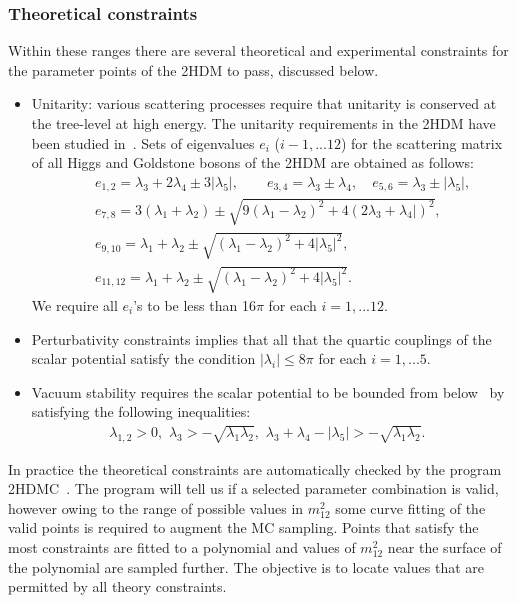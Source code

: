 \subsubsection{Theoretical constraints}
Within these ranges there are several theoretical and experimental constraints for the parameter points of the 2HDM to pass, discussed below.	
\begin{itemize}
	\item Unitarity: various scattering processes  require that unitarity is conserved at the tree-level at high energy.
    The unitarity requirements in the 2HDM have been studied in~\cite{Kanemura1993LeeQuiggThacker, Akeroyd2000TreeLevel, arhrib2000unitarity}.
	Sets of eigenvalues $e_i$ ($i-1, ... 12$) for the scattering  matrix of all Higgs and Goldstone bosons of the 2HDM are obtained as follows:
	\begin{eqnarray}
	&& e_{1,2} =  \lambda_3+2\lambda_4\pm 3 | \lambda_5| , \quad  \quad  e_{3,4} = \lambda_3\pm\lambda_4 , \quad e_{5,6} =  \lambda_3\pm|\lambda_5|,  \nonumber \\
	&&
	e_{7,8} = 3(\lambda_1+\lambda_2)\pm\sqrt{9(\lambda_1-\lambda_2)^2+4(2\lambda_3+\lambda_4|)^2},  \nonumber \\
	&&
	e_{9,10} = \lambda_1+\lambda_2\pm\sqrt{(\lambda_1-\lambda_2)^2+4|\lambda_5|^2},  \nonumber \\
	&&
	e_{11,12}  = \lambda_1+\lambda_2\pm\sqrt{(\lambda_1-\lambda_2)^2+4|\lambda_5|^2}.
	\end{eqnarray}
    We require all \(e_i\)'s to be less than 16\(\pi\) for each \(i=1,...12\).
\item Perturbativity constraints \cite{Kanemura1993LeeQuiggThacker,Branco_2HDMreview2011} implies that all that the quartic couplings of the scalar potential satisfy the condition \(|\lambda_i| \leqslant 8 \pi\) for each \(i=1,...5\).
	
	\item Vacuum stability requires the scalar potential to be bounded from below~\cite{Gunion2003decouple} by satisfying the following inequalities:
	\begin{eqnarray}
	\lambda_{1,2}>0,  \,\,
	\lambda_3>- \sqrt{\lambda_1\lambda_2}, \,\,
	\lambda_3+\lambda_4-|\lambda_5|> - \sqrt{\lambda_1\lambda_2}.~~~
	\end{eqnarray}
	
\end{itemize}
In practice the theoretical constraints are automatically checked by the program 2HDMC~\cite{Eriksson20102HDMC}.
The program will tell us if a selected parameter combination is valid,
however owing to the range of possible values in \(m_{12}^2\) some curve fitting of the valid points
is required to augment the MC sampling.
Points that satisfy the most constraints are fitted to a polynomial and
values of \(m_{12}^2\) near the surface of the polynomial are sampled further.
The objective is to locate values that are permitted by all theory constraints.

